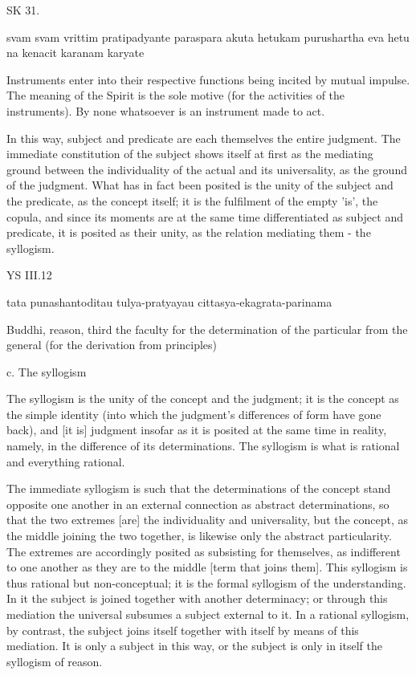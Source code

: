 SK 31.

svam svam vrittim pratipadyante paraspara akuta hetukam
purushartha eva hetu na kenacit karanam karyate

Instruments enter into their respective functions being incited by mutual impulse.
The meaning of the Spirit is the sole motive (for the activities of the instruments).
By none whatsoever is an instrument made to act.

In this way, subject and predicate are each themselves the entire judgment.
The immediate constitution of the subject shows itself at first as the mediating ground
between the individuality of the actual and its universality, as the ground of the judgment.
What has in fact been posited is the unity of the subject and the predicate, as the concept itself;
it is the fulfilment of the empty 'is', the copula,
and since its moments are at the same time differentiated as subject and predicate,
it is posited as their unity, as the relation mediating them - the syllogism.

YS III.12

tata punashantoditau tulya-pratyayau cittasya-ekagrata-parinama

Buddhi, reason, third the faculty for the determination of the particular
from the general (for the derivation from principles)

c. The syllogism

The syllogism is the unity of the concept and the judgment;
it is the concept as the simple identity
(into which the judgment's differences of form have gone back),
and [it is] judgment insofar as it is posited at the same time in reality,
namely, in the difference of its determinations.
The syllogism is what is rational and everything rational.

The immediate syllogism is such that the determinations of the concept
stand opposite one another in an external connection as abstract determinations,
so that the two extremes [are] the individuality and universality,
but the concept, as the middle joining the two together,
is likewise only the abstract particularity.
The extremes are accordingly posited as subsisting for themselves,
as indifferent to one another as they are to the middle [term that joins them].
This syllogism is thus rational but non-conceptual;
it is the formal syllogism of the understanding.
In it the subject is joined together with another determinacy;
or through this mediation the universal subsumes a subject external to it.
In a rational syllogism, by contrast, the subject joins itself
together with itself by means of this mediation.
It is only a subject in this way, or the subject is only in itself
the syllogism of reason.

